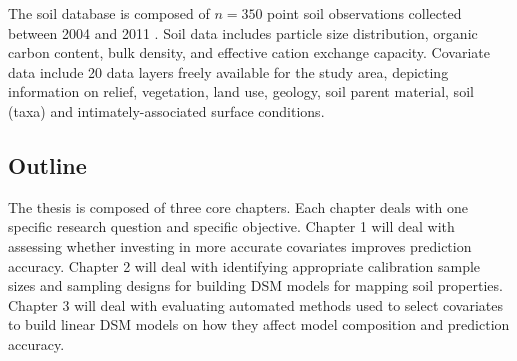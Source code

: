 The soil database is composed of $n=350$ point soil observations collected between 2004 and 2011 
\citep{PedronEtAl2006b, SamuelRosaEtAl2011a, MiguelEtAl2012, Samuel-RosaEtAl2013}. Soil data 
includes particle size distribution, organic carbon content, bulk density, and effective 
cation exchange capacity. Covariate data include 20 data layers freely available for the study area, 
depicting information on relief, vegetation, land use, geology, soil parent material, soil (taxa) 
and intimately-associated surface conditions.

\subsection{Outline}

The thesis is composed of three core chapters. Each chapter deals with one specific 
research question and specific objective. Chapter 1 will deal with assessing 
whether investing in more accurate covariates improves prediction accuracy. 
Chapter 2 will deal with identifying appropriate calibration sample sizes and 
sampling designs for building DSM models for mapping soil properties. Chapter 3 
will deal with evaluating automated methods used to select covariates to build 
linear DSM models on how they affect model composition and prediction accuracy.
